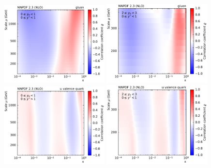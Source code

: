 \begin{figure}[p]
  \centering
  \includegraphics[width=0.49\textwidth]{figures/pdf_constraints/corr_PTMAXEXPYS_YBYS_NLO_FINALBINS_NNPDF23_gluon_ys0_0yb0_0_cl.pdf}\hfill%
  \includegraphics[width=0.49\textwidth]{figures/pdf_constraints/corr_PTMAXEXPYS_YBYS_NLO_FINALBINS_NNPDF23_gluon_ys0_0yb2_0_cl.pdf}
  \includegraphics[width=0.49\textwidth]{figures/pdf_constraints/corr_PTMAXEXPYS_YBYS_NLO_FINALBINS_NNPDF23_u_valence_quark_ys0_0yb0_0_cl.pdf}\hfill%
  \includegraphics[width=0.49\textwidth]{figures/pdf_constraints/corr_PTMAXEXPYS_YBYS_NLO_FINALBINS_NNPDF23_u_valence_quark_ys0_0yb2_0_cl.pdf}

\end{figure}
